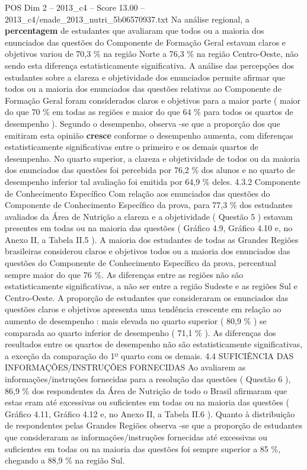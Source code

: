 \begin{textsample}{POS Dim 2 – 2013\_c4 – Score 13.00 – 2013\_c4/enade\_2013\_nutri\_5b06570937.txt}
Na análise regional, a \textbf{percentagem} de estudantes que avaliaram que todos ou a maioria dos enunciados das questões do Componente de Formação Geral estavam claros e objetivos variou de 70,3 \% na região Norte a 76,3 \% na região Centro-Oeste, não sendo esta diferença estatisticamente significativa.
A análise das percepções dos estudantes sobre a clareza e objetividade dos enunciados permite afirmar que todos ou a maioria dos enunciados das questões relativas ao Componente de Formação Geral foram considerados claros e objetivos para a maior parte ( maior do que 70 \% em todas as regiões e maior do que 64 \% para todos os quartos de desempenho ).
Segundo o desempenho, observa -se que a proporção dos que emitiram esta opinião \textbf{cresce} conforme o desempenho aumenta, com diferenças estatisticamente significativas entre o primeiro e os demais quartos de desempenho.
No quarto superior, a clareza e objetividade de todos ou da maioria dos enunciados das questões foi percebida por 76,2 \% dos alunos e no quarto de desempenho inferior tal avaliação foi emitida por 64,9 \% deles. 4.3.2 Componente de Conhecimento Específico Com relação aos enunciados das questões do Componente de Conhecimento Específico da prova, para 77,3 \% dos estudantes avaliados da Área de Nutrição a clareza e a objetividade ( Questão 5 ) estavam presentes em todas ou na maioria das questões ( Gráfico 4.9, Gráfico 4.10 e, no Anexo II, a Tabela II.5 ).
A maioria dos estudantes de todas as Grandes Regiões brasileiras considerou claros e objetivos todos ou a maioria dos enunciados das questões do Componente de Conhecimento Específico da prova, percentual sempre maior do que 76 \%.
As diferenças entre as regiões não são estatisticamente significativas, a não ser entre a região Sudeste e as regiões Sul e Centro-Oeste.
A proporção de estudantes que consideraram os enunciados das questões claros e objetivos apresenta uma tendência crescente em relação ao aumento de desempenho : mais elevada no quarto superior ( 80,9 \% ) se comparada ao quarto inferior de desempenho ( 71,1 \% ).
As diferenças dos resultados entre os quartos de desempenho não são estatisticamente significativas, a exceção da comparação do 1º quarto com os demais. 4.4 SUFICIÊNCIA DAS INFORMAÇÕES/INSTRUÇÕES FORNECIDAS Ao avaliarem as informações/instruções fornecidas para a resolução das questões ( Questão 6 ), 86,9 \% dos respondentes da Área de Nutrição de todo o Brasil afirmaram que estas eram até excessivas ou suficientes em todas ou na maioria das questões ( Gráfico 4.11, Gráfico 4.12 e, no Anexo II, a Tabela II.6 ).
Quanto à distribuição de respondentes pelas Grandes Regiões observa -se que a proporção de estudantes que consideraram as informações/instruções fornecidas até excessivas ou suficientes em todas ou na maioria das questões foi sempre superior a 85 \%, chegando a 88,9 \% na região Sul.

\end{textsample}
